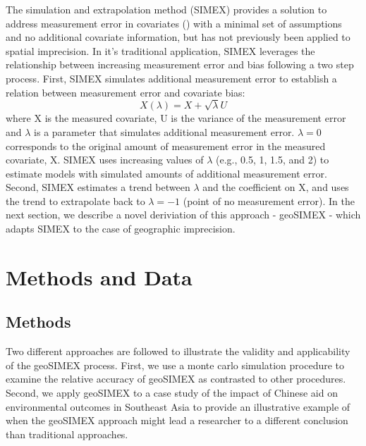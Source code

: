 \par
The simulation and extrapolation method (SIMEX) provides a solution to address measurement error in covariates (\cite{wang_bias_1998,kuchenhoff_general_2006,li_functional_2003,cook_simulation-extrapolation_1994}) with a minimal set of assumptions and no additional covariate information, but has not previously been applied to spatial imprecision. 
In it's traditional application, SIMEX leverages the relationship between increasing measurement error and bias following a two step process. 
First, SIMEX simulates additional measurement error to establish a relation between measurement error and covariate bias:
\begin{equation}
X(\lambda) = X + \sqrt{\lambda}U
\end{equation}
where X is the measured covariate, U is the variance of the measurement error and $\lambda$ is a parameter that simulates additional measurement error. 
$\lambda=0$ corresponds to the original amount of measurement error in the measured covariate, X. 
SIMEX uses increasing values of $\lambda$ (e.g., 0.5, 1, 1.5, and 2) to estimate models with simulated amounts of additional measurement error. 
Second, SIMEX estimates a trend between $\lambda$ and the coefficient on X, and uses the trend to extrapolate back to $\lambda = -1$ (point of no measurement error).  In the next section, we describe a novel deriviation of this approach - geoSIMEX - which adapts SIMEX to the case of geographic imprecision.  








\section{Methods and Data}
\subsection{Methods}
Two different approaches are followed to illustrate the validity and applicability of the geoSIMEX process.
First, we use a monte carlo simulation procedure to examine the relative accuracy of geoSIMEX as contrasted to other procedures.  
Second, we apply geoSIMEX to a case study of the impact of Chinese aid on environmental outcomes in Southeast Asia to provide an illustrative example of when the geoSIMEX approach might lead a researcher to a different conclusion than traditional approaches.

